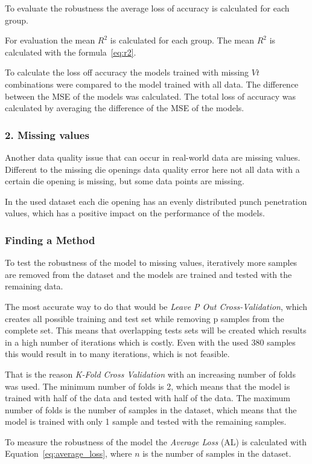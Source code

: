 To evaluate the robustness the average loss of accuracy is calculated for each group.

For evaluation the mean $R^2$ is calculated for each group. The mean $R^2$ is calculated with the formula~\ref{eq:r2}.


To calculate the loss off accuracy the models trained with missing $Vt$ combinations were compared to the model trained with all data.
The difference between the \ac{MSE} of the models was calculated. The total loss of accuracy was calculated by averaging the difference of the \ac{MSE} of the models.

\subsubsection*{2. Missing values}
Another data quality issue that can occur in real-world data are missing values.
Different to the missing die openings data quality error here not all data with a certain die opening is missing, but some data points are missing.

In the used dataset each die opening has an evenly distributed punch penetration values, which has a positive impact on the performance of the models.

\subsubsection*{Finding a Method}
To test the robustness of the model to missing values, iteratively more samples are removed from the dataset and the models are trained and tested with the remaining data.

The most accurate way to do that would be \textit{Leave P Out Cross-Validation}, which creates all possible training and test set while removing p samples from the complete set. This means that overlapping tests sets will be created which results in a high number of iterations which is costly.
Even with the used 380 samples this would result in to many iterations, which is not feasible.

That is the reason \textit{K-Fold Cross Validation} with an increasing number of folds was used.
The minimum number of folds is 2, which means that the model is trained with half of the data and tested with half of the data.
The maximum number of folds is the number of samples in the dataset, which means that the model is trained with only 1 sample and tested with the remaining samples.

To measure the robustness of the model the \textit{Average Loss} (AL) is calculated with Equation~\ref{eq:average_loss}, where $n$ is the number of samples in the dataset.

